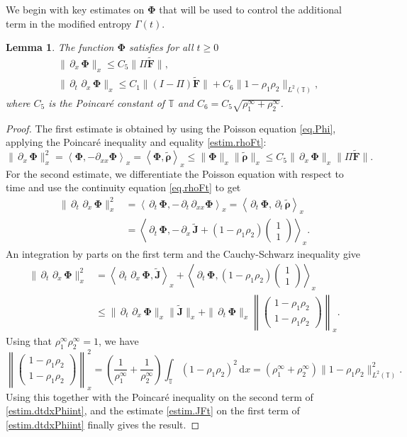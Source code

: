 \documentclass[reqno]{amsart}
\newtheorem{Lemma}{Lemma}
\newcommand{\dt}{\,\partial_t\, }
\newcommand{\dx}{\,\partial_x\, }
\newcommand{\dd}{\,\mathrm{d}}
\newcommand{\T}{\mathbb{T}}
\newcommand{\Ft}{{\widetilde{F}}}
\newcommand{\rhot}{\widetilde{\rho}}
\newcommand{\Jt}{\widetilde{J}}
\newcommand{\Ftbf}{\mathbf{\Ft}}
\newcommand{\Phibf}{\boldsymbol{\Phi}}
\newcommand{\rhotbf}{\boldsymbol{\rhot}}
\newcommand{\Jtbf}{\mathbf{\Jt}}
\newcommand{\lla}{\left\langle}
\newcommand{\rra}{\right\rangle}
\numberwithin{equation}{section}
\begin{document}
We begin with key estimates on $\Phibf$ that will be used to control the additional term in the modified entropy $\Gamma(t)$.
\begin{Lemma}
    The function $\Phibf$ satisfies for all $t\geq 0$
    \begin{align}
        &\|\dx\Phibf\|_x\leq C_5\|\Pi \Ftbf\|, \label{estim.dxphi}\\
        &\|\dt\dx\Phibf\|_x\leq C_1\|(I-\Pi)\Ftbf\|+C_6\|1-\rho_1\rho_2\|_{L^2(\T)}, \label{estim.dtdxphi}
    \end{align}
    where $C_5$ is the Poincaré constant of $\T$ and $C_6=C_5\sqrt{\rho_1^\infty+\rho_2^\infty}$.
\end{Lemma}
\begin{proof}
    The first estimate is obtained by using the Poisson equation \eqref{eq.Phi}, applying the Poincaré inequality and equality \eqref{estim.rhoFt}:
    \[ \|\dx\Phibf\|_x^2=\lla\Phibf,-\partial_{xx}\Phibf\rra_x=\lla\Phibf,\rhotbf\rra_x\leq \|\Phibf\|_x\|\rhotbf\|_x\leq C_5\|\dx\Phibf\|_x\|\Pi\Ftbf\|.\]
    For the second estimate, we differentiate the Poisson equation with respect to time and use the continuity equation \eqref{eq.rhoFt} to get
    \begin{align*}
        \|\dt\dx\Phibf\|_x^2&=\lla \dt\Phibf,-\dt\partial_{xx}\Phibf\rra_x=\lla\dt\Phibf,\dt\rhotbf\rra_x\\
        &=\lla\dt\Phibf,-\dx \Jtbf+(1-\rho_1\rho_2)\left(\begin{matrix}1\\1\end{matrix}\right)\rra_x.
    \end{align*}
    An integration by parts on the first term and the Cauchy-Schwarz inequality give
    \begin{align}
        \|\dt\dx\Phibf\|_x^2&=\lla\dt\dx\Phibf,\Jtbf\rra_x+\lla\dt\Phibf,(1-\rho_1\rho_2)\left(\begin{matrix}1\\ 1\end{matrix}\right)\rra_x \nonumber\\
        &\leq \|\dt\dx\Phibf\|_x\|\Jtbf\|_x+\|\dt\Phibf\|_x\left\|\left(\begin{matrix}1-\rho_1\rho_2\\1-\rho_1\rho_2\end{matrix}\right)\right\|_x. \label{estim.dtdxPhiint}
    \end{align}
    Using that $\rho_1^\infty\rho_2^\infty=1$, we have
    \begin{equation*}
        \left\|\left(\begin{matrix}1-\rho_1\rho_2\\1-\rho_1\rho_2\end{matrix}\right)\right\|_x^2=\left(\frac{1}{\rho_1^\infty}+\frac{1}{\rho_2^\infty}\right)\int_\T(1-\rho_1\rho_2)^2\dd x=(\rho_1^\infty+\rho_2^\infty)\|1-\rho_1\rho_2\|_{L^2(\T)}^2.
    \end{equation*}
    Using this together with the Poincaré inequality on the second term of \eqref{estim.dtdxPhiint}, and the estimate \eqref{estim.JFt} on the first term of \eqref{estim.dtdxPhiint} finally gives the result.
\end{proof}
\end{document}
